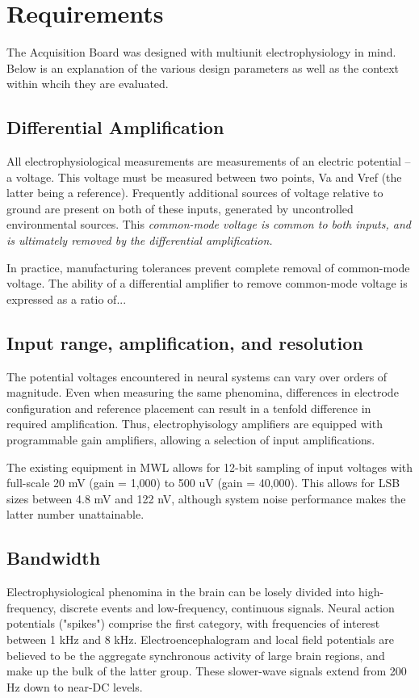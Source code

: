 
\section{Requirements}

The Acquisition Board was designed with multiunit electrophysiology in
mind. Below is an explanation of the various design parameters as well as the context within whcih they are evaluated. 

\subsection{Differential Amplification}
All electrophysiological measurements are measurements of an electric
potential -- a voltage. This voltage must be measured between two
points, Va and Vref (the latter being a reference). Frequently
additional sources of voltage relative to ground are present on both
of these inputs, generated by uncontrolled environmental sources. This
\em{common-mode voltage} is common to both inputs, and is ultimately
removed by the differential amplification.

 
In practice, manufacturing tolerances prevent complete removal of
common-mode voltage. The ability of a differential amplifier to remove
common-mode voltage is expressed as a ratio of...


\subsection{Input range, amplification, and resolution}

The potential voltages encountered in neural systems can
vary over orders of magnitude. Even when measuring the same
phenomina, differences in electrode configuration and reference
placement can result in a tenfold difference in required
amplification. Thus, electrophyisology amplifiers are equipped
with programmable gain amplifiers, allowing a selection of input
amplifications. 

The existing equipment in MWL allows for 12-bit sampling
of input voltages with full-scale 20 mV (gain = 1,000) to 500 uV
(gain = 40,000). This allows for LSB sizes between 4.8 mV and
122 nV, although system noise performance makes the latter
number unattainable.  

\subsection{Bandwidth}

Electrophysiological phenomina in the brain can be losely divided into
high-frequency, discrete events and low-frequency, continuous signals.
Neural action potentials ("spikes") comprise the first category, with
frequencies of interest between 1 kHz and 8 kHz. Electroencephalogram
and local field potentials are believed to be the aggregate
synchronous activity of large brain regions, and make up the bulk of
the latter group. These slower-wave signals extend from 200 Hz down to
near-DC levels.


